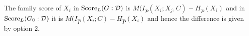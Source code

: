 The family score of $X_i$ in ${\rm Score}_L(G : {\cal D})$ is $M (I_{\hat{P}}(X_i; X_j,C) - H_{\hat{P}}(X_i)$ and in ${\rm Score}_L(G_0 : {\cal D})$ it is $M (I_{\hat{P}}(X_i; C) - H_{\hat{P}}(X_i)$ and hence the difference is given by option 2.
